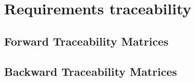 \documentclass[Main]{subfiles}
\begin{document}
\chapter{Requirements traceability}
\section{Forward Traceability Matrices}


\section{Backward Traceability Matrices}
\end{document}
